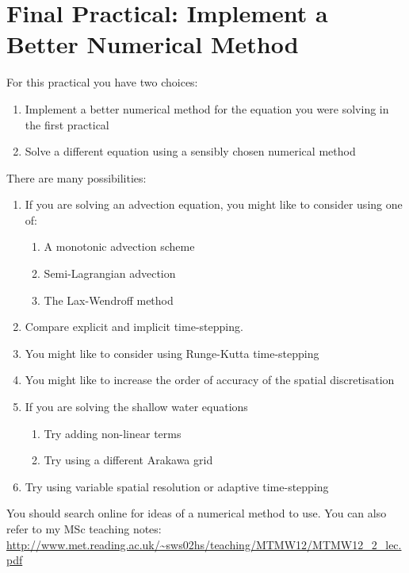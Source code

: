 
\chapter*{Final Practical: Implement a Better Numerical Method }


For this practical you have two choices:
\begin{enumerate}
\item Implement a better numerical method for the equation you were solving
in the first practical
\item Solve a different equation using a sensibly chosen numerical method
\end{enumerate}
There are many possibilities:
\begin{enumerate}
\item If you are solving an advection equation, you might like to consider
using one of:

\begin{enumerate}
\item A monotonic advection scheme
\item Semi-Lagrangian advection
\item The Lax-Wendroff method
\end{enumerate}
\item Compare explicit and implicit time-stepping.
\item You might like to consider using Runge-Kutta time-stepping
\item You might like to increase the order of accuracy of the spatial discretisation
\item If you are solving the shallow water equations

\begin{enumerate}
\item Try adding non-linear terms
\item Try using a different Arakawa grid
\end{enumerate}
\item Try using variable spatial resolution or adaptive time-stepping
\end{enumerate}
You should search online for ideas of a numerical method to use. You
can also refer to my MSc teaching notes:\\
{\small{} \url{http://www.met.reading.ac.uk/~sws02hs/teaching/MTMW12/MTMW12_2_lec.pdf}}{\small\par}
